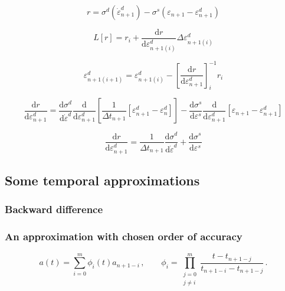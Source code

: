 \documentclass[12pt]{article}
\newcommand{\der}[2]{\dfrac{\text{d} #1}{\text{d} #2}}
\begin{document}
\begin{equation}
		r = \sigma^{d}\left(\dot{\varepsilon}_{n+1}^{d}\right) - \sigma^{s}(\varepsilon_{n+1} - \varepsilon_{n+1}^{d})  
\end{equation}

\begin{equation}
	L[r] = r_{i} + \der{r}{\varepsilon_{n+1(i)}^{d}} \Delta \varepsilon_{n+1(i)}^{d}
\end{equation}

\begin{equation}
	\varepsilon_{n+1(i+1)}^{d} = 	\varepsilon_{n+1(i)}^{d} - \left[\der{r}{\varepsilon_{n+1}^{d}}\right]_{i}^{-1}r_{i}
\end{equation}

\begin{equation}
	\der{r}{\varepsilon_{n+1}^{d}} = \der{\sigma^{d}}{\dot{\varepsilon}^{d}}\der{ }{\varepsilon_{n+1}^{d} }\left[ \dfrac{1}{\Delta t_{n+1}}\left[\varepsilon_{n+1}^{d} - \varepsilon_{n}^{d}\right]\right] - \der{\sigma^{s}}{\varepsilon^{s}}\der{ }{\varepsilon_{n+1}^{d}}\left[\varepsilon_{n+1} - \varepsilon_{n+1}^{d}\right]
\end{equation}


\begin{equation}
	\der{r}{\varepsilon_{n+1}^{d}} = \dfrac{1}{\Delta t_{n+1}}\der{\sigma^{d}}{\dot{\varepsilon}^{d}} + \der{\sigma^{s}}{\varepsilon^{s}}
\end{equation}

\subsection{Some temporal approximations}

\subsubsection{Backward difference}

\subsubsection{An approximation with chosen order of accuracy}

\begin{equation}
	a\left(t\right) = \sum_{i=0}^{m}\phi_{i}\left(t\right)a_{n+1-i}\,, \qquad \phi_{i} = \prod_{\substack{j=0\\ j\neq i}}^{m}\dfrac{t - t_{n+1-j}}{t_{n+1-i} - t_{n+1-j}}\,.
\end{equation}
\end{document}
